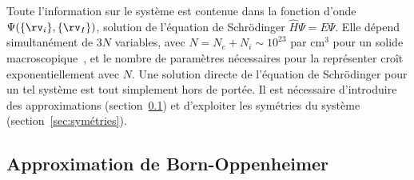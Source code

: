 Toute l'information sur le système est contenue dans la fonction d'onde $\Psi(\{\rv_i\}, \{\rv_I\})$, solution de l'équation de Schrödinger $\hat{H}\Psi=E\Psi$. Elle dépend simultanément de $3N$ variables, avec $N=N_e+N_i \sim 10^{23}$ par cm$^{3}$ pour un solide macroscopique~\cite{alloulIntroductionPhysicsElectrons2011a}, et le nombre de paramètres nécessaires pour la représenter croît exponentiellement avec $N$. Une solution directe de l'équation de Schrödinger pour un tel système est tout simplement hors de portée. Il est nécessaire d'introduire des approximations (section~\ref{sec:BO}) et d'exploiter les symétries du système (section~\ref{sec:symétries}).

\subsection{Approximation de Born-Oppenheimer}\label{sec:BO}

